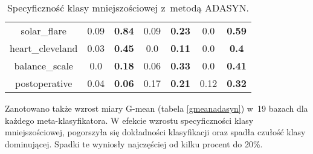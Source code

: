 \begin{table}[H]
\begin{center}
{\begin{tabular}{c|cccccc}
				solar\_flare&0.09&\textbf{0.84}&0.09&\textbf{0.23}&0.0&\textbf{0.59}\\%
				heart\_cleveland&0.03&\textbf{0.45}&0.0&\textbf{0.11}&0.0&\textbf{0.4}\\%
				balance\_scale&0.0&\textbf{0.18}&0.06&\textbf{0.33}&0.0&\textbf{0.41}\\%
				postoperative&0.04&\textbf{0.06}&0.17&\textbf{0.21}&0.12&\textbf{0.32}\\%
			\end{tabular}}
			\caption{Specyficzność klasy mniejszościowej z~metodą ADASYN.}
			\label{specadasyn}
		\end{center}
	\end{table}
Zanotowano także wzrost miary G-mean (tabela \ref{gmeanadasyn}) w~19 bazach dla każdego meta-klasyfikatora. W efekcie wzrostu specyficzności klasy mniejszościowej, pogorszyła się dokładności klasyfikacji oraz spadła czułość klasy dominującej. Spadki te wyniosły najczęściej od kilku procent do 20\%.

